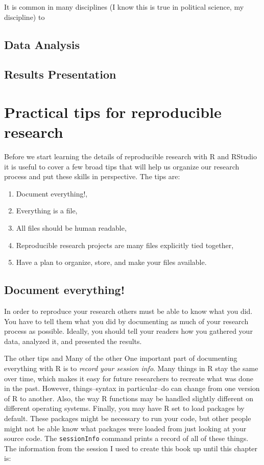 \documentclass[ChapterTOCs,krantz1]{krantz}\usepackage{graphicx, color}
\begin{document}
It is common in many disciplines (I know this is true in political science, my discipline) to 

\subsection{Data Analysis}

\subsection{Results Presentation}

\section{Practical tips for reproducible research}

Before we start learning the details of reproducible research with R and RStudio it is useful to cover a few broad tips that will help us organize our research process and put these skills in perspective. The tips are:

\begin{enumerate}
    \item Document everything!,
    \item Everything is a file,
    \item All files should be human readable,
    \item Reproducible research projects are many files explicitly tied together,
    \item Have a plan to organize, store, and make your files available.
    
\end{enumerate}

\subsection{Document everything!}

In order to reproduce your research others must be able to know what you did. You have to tell them what you did by documenting as much of your research process as possible. Ideally, you should tell your readers how you gathered your data, analyzed it, and presented the results.

The other tips and Many of the other One important part of documenting everything with R is to \emph{record your session info}. Many things in R stay the same over time, which makes it easy for future researchers to recreate what was done in the past. However, things--syntax in particular--do can change from one version of R to another. Also, the way R functions may be handled slightly different on different operating systems. Finally, you may have R set to load packages by default. These packages might be necessary to run your code, but other people might not be able know what packages were loaded from just looking at your source code. The \texttt{sessionInfo} command prints a record of all of these things. The information from the session I used to create this book up until this chapter is:
\end{document}
